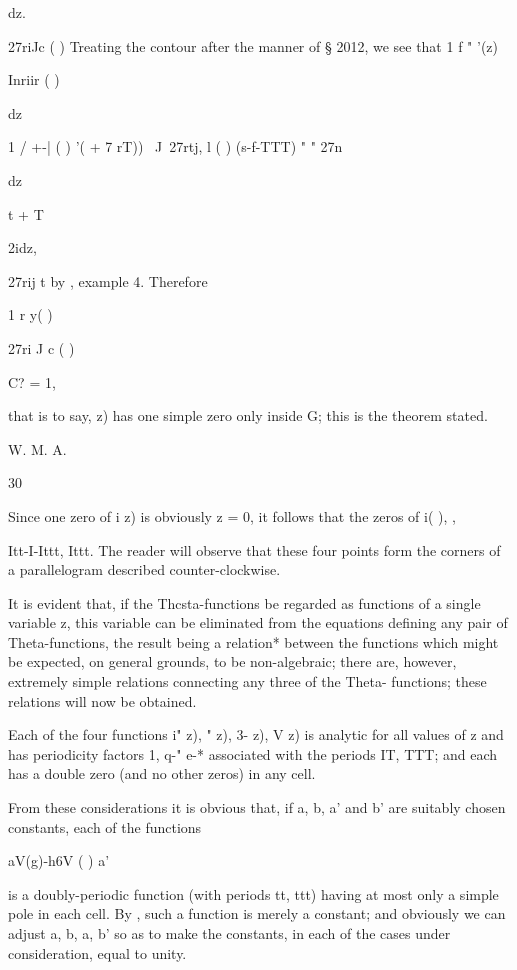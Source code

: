 dz.

27riJc ( ) Treating the contour after the manner of § 2012, we see
that 1 f " '(z)

Inriir ( )

dz

1 / +-| ( ) '( + 7 rT)) \ J\ 27rtj, l ( ) (s-f-TTT) " " 27n

dz

t + T

2idz,

27rij t by , example 4. Therefore

1 r y( )

27ri J c ( )

C? = 1,

that is to say, z) has one simple zero only inside G; this is the
theorem stated.

W. M. A.

30

%
%

Since one zero of i z) is obviously z = 0, it follows that the zeros
of i( ), %
,

Itt-I-Ittt, Ittt. The reader will observe that these four points form
the corners of a parallelogram described counter-clockwise.


It is evident that, if the Thcsta-functions be regarded as functions
of a single variable z, this variable can be eliminated from the
equations defining any pair of Theta-functions, the result being a
relation* between the functions which might be expected, on general
grounds, to be non-algebraic; there are, however, extremely simple
relations connecting any three of the Theta- functions; these
relations will now be obtained.

Each of the four functions i" z), " z), 3- z), V z) is analytic for
all values of z and has periodicity factors 1, q-" e-* associated with
the periods IT, TTT; and each has a double zero (and no other zeros)
in any cell.

From these considerations it is obvious that, if a, b, a' and b' are
suitably chosen constants, each of the functions

aV(g)-h6V ( ) a'%

is a doubly-periodic function (with periods tt, ttt) having at most
only a simple pole in each cell. By , such a function is merely
a constant; and obviously we can adjust a, b, a, b' so as to make the
constants, in each of the cases under consideration, equal to unity.

